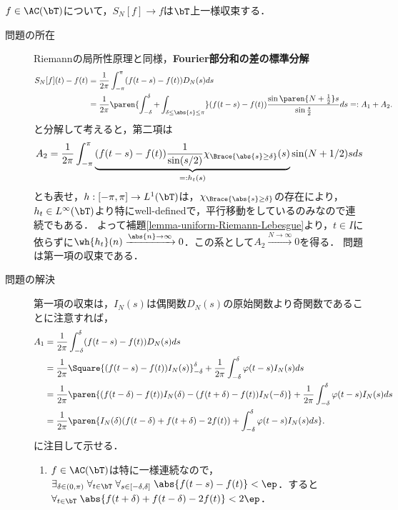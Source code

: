 \documentclass[uplatex,dvipdfmx]{jsreport}
\begin{document}
\begin{theorem}[一様収束の十分条件]\label{thm-uniform-convergence-of-Fourier-series}
    $f\in\AC(\bT)$について，$S_N[f]\to f$は$\bT$上一様収束する．
\end{theorem}
\begin{Proof}\mbox{}
    \begin{description}
        \item[問題の所在] Riemannの局所性原理と同様，\textbf{Fourier部分和の差の標準分解}
        \begin{align*}
            S_N[f](t)-f(t)&=\frac{1}{2\pi}\int^\pi_{-\pi}(f(t-s)-f(t))D_N(s)ds\\
            &=\frac{1}{2\pi}\paren{\int^\delta_{-\delta}+\int_{\delta\le\abs{s}\le\pi}}(f(t-s)-f(t))\frac{\sin\paren{N+\frac{1}{2}}s}{\sin\frac{s}{2}}ds=:A_1+A_2.
        \end{align*}
        と分解して考えると，第二項は
        \[A_2=\frac{1}{2\pi}\int^\pi_{-\pi}\underbrace{(f(t-s)-f(t))\frac{1}{\sin(s/2)}\chi_{\Brace{\abs{s}\ge\delta}}(s)}_{=:h_t(s)}\sin(N+1/2)sds\]
        とも表せ，$h:[-\pi,\pi]\to L^1(\bT)$は，$\chi_{\Brace{\abs{s}\ge\delta}}$の存在により，$h_t\in L^\infty(\bT)$より特にwell-definedで，平行移動をしているのみなので連続でもある．
        よって補題\ref{lemma-uniform-Riemann-Lebesgue}より，$t\in I$に依らずに$\wh{h_t}(n)\xrightarrow{\abs{n}\to\infty}0$．この系として$A_2\xrightarrow{N\to\infty}0$を得る．
        問題は第一項の収束である．
        \item[問題の解決] 第一項の収束は，$I_N(s)$は偶関数$D_N(s)$の原始関数より奇関数であることに注意すれば，
        \begin{align*}
            A_1&=\frac{1}{2\pi}\int^\delta_{-\delta}(f(t-s)-f(t))D_N(s)ds\\
            &=\frac{1}{2\pi}\Square{(f(t-s)-f(t))I_N(s)}^\delta_{-\delta}+\frac{1}{2\pi}\int^\delta_{-\delta}\varphi(t-s)I_N(s)ds\\
            &=\frac{1}{2\pi}\paren{(f(t-\delta)-f(t))I_N(\delta)-(f(t+\delta)-f(t))I_N(-\delta)}+\frac{1}{2\pi}\int^\delta_{-\delta}\varphi(t-s)I_N(s)ds\\
            &=\frac{1}{2\pi}\paren{I_N(\delta)(f(t-\delta)+f(t+\delta)-2f(t))+\int^\delta_{-\delta}\varphi(t-s)I_N(s)ds}.
        \end{align*}
        に注目して示せる．
        \begin{enumerate}
            \item $f\in\AC(\bT)$は特に一様連続なので，$\exists_{\delta\in(0,\pi)}\;\forall_{t\in\bT}\;\forall_{s\in[-\delta,\delta]}\;\abs{f(t-s)-f(t)}<\ep$．すると$\forall_{t\in\bT}\;\abs{f(t+\delta)+f(t-\delta)-2f(t)}<2\ep$．

\end{enumerate}
\end{description}
\end{Proof}
\end{document}
